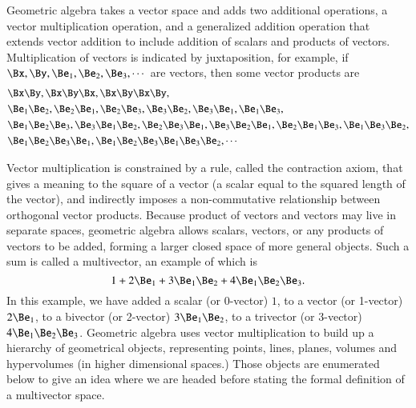 %
%
Geometric algebra takes a vector space and adds two additional operations, a vector multiplication operation, and a generalized addition operation that extends vector addition to include addition of scalars and products of vectors.
Multiplication of vectors is indicated by juxtaposition, for example, if \( \Bx, \By, \Be_1, \Be_2, \Be_3, \cdots \) are vectors, then some vector products are
\begin{dmath}\label{eqn:multivector:20}
\begin{aligned}
&\Bx \By, \Bx \By \Bx, \Bx \By \Bx \By, \\
&\Be_1 \Be_2, \Be_2 \Be_1, \Be_2 \Be_3, \Be_3 \Be_2, \Be_3 \Be_1, \Be_1 \Be_3, \\
&\Be_1 \Be_2 \Be_3, \Be_3 \Be_1 \Be_2, \Be_2 \Be_3 \Be_1, \Be_3 \Be_2 \Be_1, \Be_2 \Be_1 \Be_3, \Be_1 \Be_3 \Be_2, \\
&\Be_1 \Be_2 \Be_3 \Be_1, \Be_1 \Be_2 \Be_3 \Be_1 \Be_3 \Be_2, \cdots
\end{aligned}
\end{dmath}

Vector multiplication is constrained by a rule, called the contraction axiom, that gives a meaning to the square of a vector (a scalar equal to the squared length of the vector), and indirectly imposes a non-commutative relationship between orthogonal vector products.
%
Because product of vectors and vectors may live in separate spaces,
geometric algebra allows scalars, vectors, or any products of vectors to be added, forming a larger closed space of more general objects.  Such a sum is called a multivector, an example of which is
\begin{dmath}\label{eqn:multivector:40}
1 + 2 \Be_1 + 3 \Be_1 \Be_2 + 4 \Be_1 \Be_2 \Be_3.
\end{dmath}
In this example, we have added a
scalar (or 0-vector) \( 1 \), to a
vector (or 1-vector) \( 2 \Be_1 \), to a
bivector (or 2-vector) \( 3 \Be_1 \Be_2 \), to a
trivector (or 3-vector) \( 4 \Be_1 \Be_2 \Be_3 \).
Geometric algebra uses vector multiplication to build up a hierarchy of geometrical objects, representing points, lines, planes, volumes and hypervolumes (in higher dimensional spaces.)  Those objects are enumerated below to give an idea where we are headed before stating the formal definition of a multivector space.

